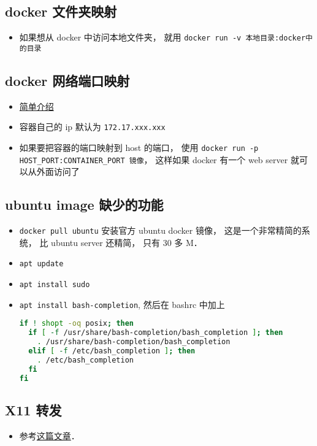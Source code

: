 \subsection{docker 文件夹映射}
\begin{itemize}
\item 如果想从 docker 中访问本地文件夹， 就用 \verb|docker run -v 本地目录:docker中的目录|
\end{itemize}

\subsection{docker 网络端口映射}
\begin{itemize}
\item \href{https://www.freecodecamp.org/news/how-to-get-a-docker-container-ip-address-explained-with-examples/}{简单介绍}
\item 容器自己的 ip 默认为 \verb`172.17.xxx.xxx`
\item 如果要把容器的端口映射到 host 的端口， 使用 \verb`docker run -p HOST_PORT:CONTAINER_PORT 镜像`， 这样如果 docker 有一个 web server 就可以从外面访问了
\end{itemize}

\subsection{ubuntu image 缺少的功能}
\begin{itemize}
\item \verb|docker pull ubuntu| 安装官方 ubuntu docker 镜像， 这是一个非常精简的系统， 比 ubuntu server 还精简， 只有 30 多 M．
\item \verb|apt update|
\item \verb`apt install sudo`
\item \verb`apt install bash-completion`, 然后在 bashrc 中加上
\begin{lstlisting}[language=bash]
if ! shopt -oq posix; then
  if [ -f /usr/share/bash-completion/bash_completion ]; then
    . /usr/share/bash-completion/bash_completion
  elif [ -f /etc/bash_completion ]; then
    . /etc/bash_completion
  fi
fi
\end{lstlisting}
\end{itemize}

\subsection{X11 转发}
\begin{itemize}
\item 参考\href{https://opendata-forum.cern.ch/t/x11-forwarding-with-docker/31}{这篇文章}．
\end{itemize}
